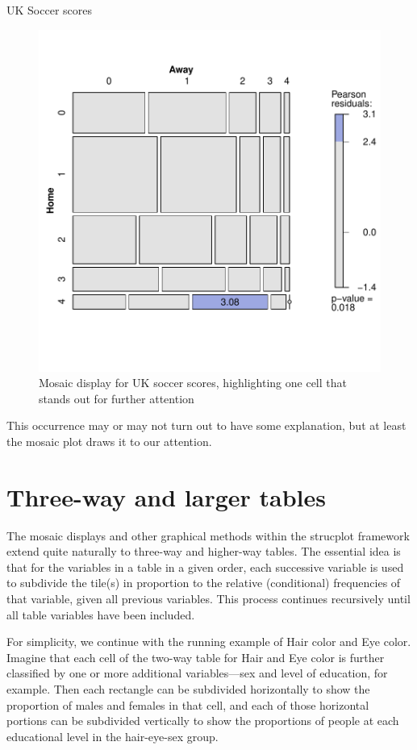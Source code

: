 \documentclass[11pt]{book}
\renewenvironment{knitrout}{\small\renewcommand{\baselinestretch}{.85}}{} %
\begin{document}
\begin{Example}[soccer2]{UK Soccer scores}
\begin{knitrout}
\begin{figure}[!htbp]
\centerline{\includegraphics[width=.6\textwidth]{ch05/fig/UKsoccer-mosaic} }

\caption[Mosaic display for UK soccer scores, highlighting one cell that stands out for further attention]{Mosaic display for UK soccer scores, highlighting one cell that stands out for further attention\label{fig:UKsoccer-mosaic}}
\end{figure}


\end{knitrout}
This occurrence may or may not turn out to have some explanation, but at least 
the mosaic plot draws it to our attention.
\end{Example}



\section{Three-way and larger tables}\label{sec:mosaic-threeway}


The mosaic displays and other graphical methods within the strucplot framework
extend quite naturally to three-way and higher-way tables.
The essential idea is that for the variables in a \mway table in a given order,
each successive variable is used to subdivide the tile(s) in proportion to
the relative (conditional) frequencies of that variable, given all previous
variables.  This process continues recursively until all table variables
have been included.

For simplicity, we continue with the running example of Hair color and Eye color.
Imagine that each
cell of the two-way table for Hair and Eye color is further
classified by one or more additional variables---sex and level of
education, for example.  Then each rectangle can be subdivided
horizontally to show the proportion of males and females in that
cell, and each of those horizontal portions can be subdivided
vertically to show the proportions of people at each educational
level in the hair-eye-sex group.
\end{document}
